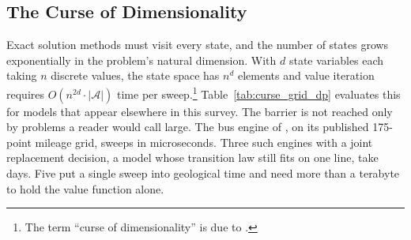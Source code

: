 %
%

\subsection{The Curse of Dimensionality}
\label{sec:curse_of_dimensionality}

Exact solution methods must visit every state, and the number of states grows exponentially in the problem's natural dimension. With $d$ state variables each taking $n$ discrete values, the state space has $n^d$ elements and value iteration requires $O(n^{2d} \cdot |\mathcal{A}|)$ time per sweep.\footnote{The term ``curse of dimensionality'' is due to \citet{Bellman1957}.} Table~\ref{tab:curse_grid_dp} evaluates this for models that appear elsewhere in this survey. The barrier is not reached only by problems a reader would call large. The bus engine of \citet{Rust1987}, on its published 175-point mileage grid, sweeps in microseconds. Three such engines with a joint replacement decision, a model whose transition law still fits on one line, take days. Five put a single sweep into geological time and need more than a terabyte to hold the value function alone.

